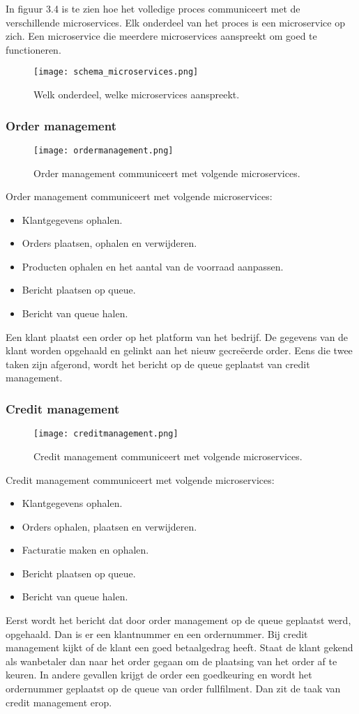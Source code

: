 In figuur 3.4 is te zien hoe het volledige proces communiceert met de verschillende microservices. Elk onderdeel van het proces is een microservice op zich. Een microservice die meerdere microservices aanspreekt om goed te functioneren.
\begin{figure}[h]
	\texttt{[image: schema\_microservices.png]}
	\caption{Welk onderdeel, welke microservices aanspreekt.}
	\centering
\end{figure}

\subsubsection{Order management}
\begin{figure}[h]
	\texttt{[image: ordermanagement.png]}
	\caption{Order management communiceert met volgende microservices.}
	\centering
\end{figure}
Order management communiceert met volgende microservices:
\begin{itemize}
	\item Klantgegevens ophalen.
	\item Orders plaatsen, ophalen en verwijderen.
	\item Producten ophalen en het aantal van de voorraad aanpassen.
	\item Bericht plaatsen op queue.
	\item Bericht van queue halen.
\end{itemize}
Een klant plaatst een order op het platform van het bedrijf. De gegevens van de klant worden opgehaald en gelinkt aan het nieuw gecreëerde order. Eens die twee taken zijn afgerond, wordt het bericht op de queue geplaatst van credit management.

\subsubsection{Credit management}
\begin{figure}[h]
	\texttt{[image: creditmanagement.png]}
	\caption{Credit management communiceert met volgende microservices.}
	\centering
\end{figure}
Credit management communiceert met volgende microservices:
\begin{itemize}
	\item Klantgegevens ophalen.
	\item Orders ophalen, plaatsen en verwijderen.
	\item Facturatie maken en ophalen.
	\item Bericht plaatsen op queue.
	\item Bericht van queue halen.
\end{itemize}
Eerst wordt het bericht dat door order management op de queue geplaatst werd, opgehaald. Dan is er een klantnummer en een ordernummer. Bij credit management kijkt of de klant een goed betaalgedrag heeft. Staat de klant gekend als wanbetaler dan naar het order gegaan om de plaatsing van het order af te keuren. In andere gevallen krijgt de order een goedkeuring en wordt het ordernummer geplaatst op de queue van order fullfilment. Dan zit de taak van credit management erop.

